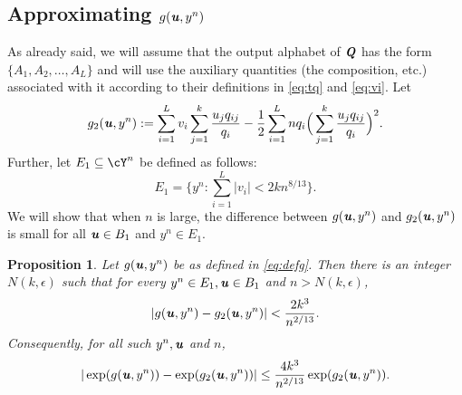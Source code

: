 \documentclass[11pt,onecolumn]{IEEEtran}
\newtheorem{proposition}[theorem]{Proposition}
\def\mathbi#1{{\textbf{\textit #1}}}
\begin{document}
\subsection{Approximating $g(\mathbi{u},y^n)$}\label{sect:approx}
As already said, we will assume that the output alphabet of $\mathbi{Q}$ has the form $\{A_1,A_2,\dots,A_L\}$ and will use 
the auxiliary quantities (the composition, etc.) associated with it according to their definitions in \eqref{eq:tq} and \eqref{eq:vi}.
Let
\begin{equation}\label{eq:defg2}
g_2(\mathbi{u},y^n) := \sum_{i=1}^L  v_i \sum_{j=1}^k \frac{u_j q_{ij}}{q_i}
-\frac{1}{2} \sum_{i=1}^L  n q_i  \Big(\sum_{j=1}^k \frac{u_j q_{ij}}{q_i} \Big)^2.
\end{equation}
Further, let $E_1\subseteq\cY^n$ be defined as follows:
 $$
E_1= \Big\{y^n : \sum_{i=1}^L |v_i| <  2 k n^{8/13} \Big\}.
 $$
We will show that when $n$ is large, the difference between $g(\mathbi{u},y^n)$ and $g_2(\mathbi{u},y^n)$ is small for all $\mathbi{u}\in B_1$ and  $y^n\in E_1$.
%
%
\begin{proposition} \label{prop:g-g2} Let $g(\mathbi{u},y^n)$ be as defined in \eqref{eq:defg}.
 Then there is an integer $N(k,\epsilon)$ such that for every $y^n\in E_1,\mathbi{u}\in B_1$ and $n>N(k,\epsilon)$,
 \begin{equation}\label{eq:||}
| g(\mathbi{u},y^n) - g_2(\mathbi{u},y^n)|
< \frac{2k^3}{n^{2/13}} 
 .
\end{equation}
Consequently, for all such $y^n,\mathbi u$ and $n$,
\begin{equation}\label{eq:E1}
| \exp(g(\mathbi{u},y^n)) - \exp(g_2(\mathbi{u},y^n)) |\le  \frac{4k^3}{n^{2/13}}   \exp(g_2(\mathbi{u},y^n)). 
\end{equation}
\end{proposition}
%
%
\end{document}
